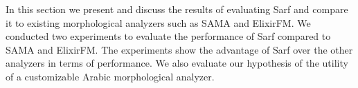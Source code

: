 In this section we present and discuss the results of evaluating Sarf and compare it to existing morphological 
analyzers such as SAMA and ElixirFM.%
%
%
%
We conducted two experiments to evaluate the performance of Sarf compared to SAMA and ElixirFM. 
The experiments show the advantage of Sarf over the other analyzers in terms of performance. 
We also evaluate our hypothesis of the utility of a customizable Arabic morphological analyzer.


